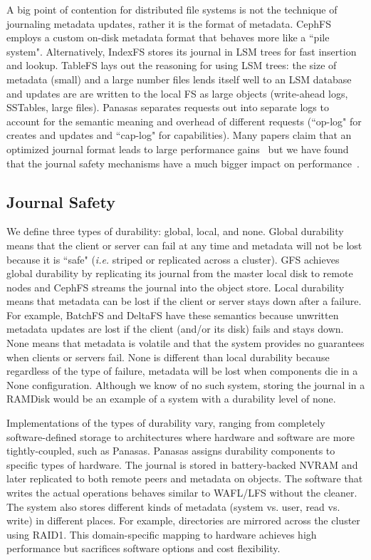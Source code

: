 A big point of contention for distributed file systems is not the technique of
journaling metadata updates, rather it is the format of metadata. CephFS
employs a custom on-disk metadata format that behaves more like a ``pile
system". Alternatively, IndexFS stores its journal in LSM trees for fast
insertion and lookup. TableFS lays out the reasoning for using LSM trees: the
size of metadata (small) and a large number files lends itself well to an LSM
database and updates are are written to the local FS as large objects
(write-ahead logs, SSTables, large files). Panasas separates requests out into
separate logs to account for the semantic meaning and overhead of different
requests (``op-log" for creates and updates and ``cap-log" for capabilities).
Many papers claim that an optimized journal format leads to large performance
gains~\cite{ren:atc2013-tablefs, ren:sc2014-indexfs, zheng:pdsw2014-batchfs}
but we have found that the journal safety mechanisms have a much bigger impact
on performance~\cite{sevilla:ipdps18-cudele}.

\subsection{Journal Safety}

We define three types of durability: global, local, and none.  Global
durability means that the client or server can fail at any time and metadata
will not be lost because it is ``safe" ({\it i.e.} striped or replicated across
a cluster). GFS achieves global durability by replicating its journal from the
master local disk to remote nodes and CephFS streams the journal into the
object store. Local durability means that metadata can be lost if the client or
server stays down after a failure. For example, BatchFS and DeltaFS have these
semantics because unwritten metadata updates are lost if the client (and/or its
disk) fails and stays down.  None means that metadata is volatile and that the
system provides no guarantees when clients or servers fail.  None is different
than local durability because regardless of the type of failure, metadata will
be lost when components die in a None configuration. Although we know of no
such system, storing the journal in a RAMDisk would be an example of a system
with a durability level of none.

Implementations of the types of durability vary, ranging from completely
software-defined storage to architectures where hardware and software are more
tightly-coupled, such as Panasas.  Panasas assigns durability components to
specific types of hardware. The journal is stored in battery-backed NVRAM and
later replicated to both remote peers and metadata on objects. The software
that writes the actual operations behaves similar to WAFL/LFS without the
cleaner. The system also stores different kinds of metadata (system vs. user,
read vs. write) in different places. For example, directories are mirrored
across the cluster using RAID1. This domain-specific mapping to hardware
achieves high performance but sacrifices software options and cost flexibility.

